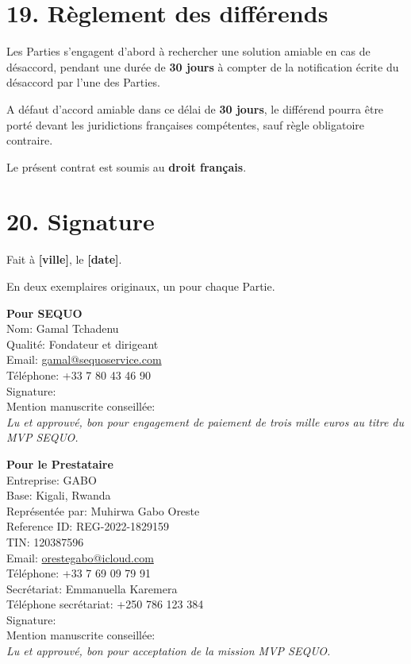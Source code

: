 \documentclass[11pt,a4paper]{article}
\newcommand{\champ}[1]{\textbf{[#1]}}
\begin{document}
\section*{19. Règlement des différends}

Les Parties s'engagent d'abord à rechercher une solution amiable en cas de désaccord, pendant une durée de \textbf{30 jours} à compter de la notification écrite du désaccord par l'une des Parties.

A défaut d'accord amiable dans ce délai de \textbf{30 jours}, le différend pourra être porté devant les juridictions françaises compétentes, sauf règle obligatoire contraire.

Le présent contrat est soumis au \textbf{droit français}.

\section*{20. Signature}

Fait à \champ{ville}, le \champ{date}.

En deux exemplaires originaux, un pour chaque Partie.

\vspace{1em}

\begin{minipage}[t]{0.47\textwidth}
\textbf{Pour SEQUO}\\
Nom: Gamal Tchadenu\\
Qualité: Fondateur et dirigeant\\
Email: \href{mailto:gamal@sequoservice.com}{gamal@sequoservice.com}\\
Téléphone: +33 7 80 43 46 90\\[2em]
Signature:\\[3em]

Mention manuscrite conseillée:\\
\textit{Lu et approuvé, bon pour engagement de paiement de trois mille euros au titre du MVP SEQUO.}
\end{minipage}
\hfill
\begin{minipage}[t]{0.47\textwidth}
\textbf{Pour le Prestataire}\\
Entreprise: GABO\\
Base: Kigali, Rwanda\\
Représentée par: Muhirwa Gabo Oreste\\
Reference ID: REG-2022-1829159\\
TIN: 120387596\\
Email: \href{mailto:orestegabo@icloud.com}{orestegabo@icloud.com}\\
Téléphone: +33 7 69 09 79 91\\
Secrétariat: Emmanuella Karemera\\
Téléphone secrétariat: +250 786 123 384\\[2em]
Signature:\\[3em]

Mention manuscrite conseillée:\\
\textit{Lu et approuvé, bon pour acceptation de la mission MVP SEQUO.}
\end{minipage}
\end{document}
